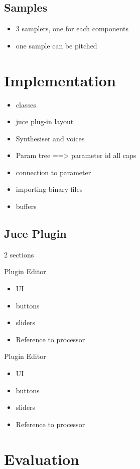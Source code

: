 \documentclass[12pt]{article}
\begin{document}
	\subsection{Samples}
	\begin{itemize}
		\item 3 samplers, one for each components
		\item one sample can be pitched
	\end{itemize}
	
		
\section{Implementation}
	
	\begin{itemize}
		\item classes
		\item juce plug-in layout
		\item Synthesiser and voices
		\item Param tree ==> parameter id all caps
		\item connection to parameter
		\item importing binary files
		\item buffers
	\end{itemize}

	\subsection{Juce Plugin}
	2 sections
	
	Plugin Editor
	\begin{itemize}
		\item UI
		\item buttons
		\item sliders
		\item Reference to processor
	\end{itemize}
	
	
	Plugin Editor
	\begin{itemize}
		\item UI
		\item buttons
		\item sliders
		\item Reference to processor
	\end{itemize}
	
	
	

	
	\section{Evaluation}
	
\end{document}
